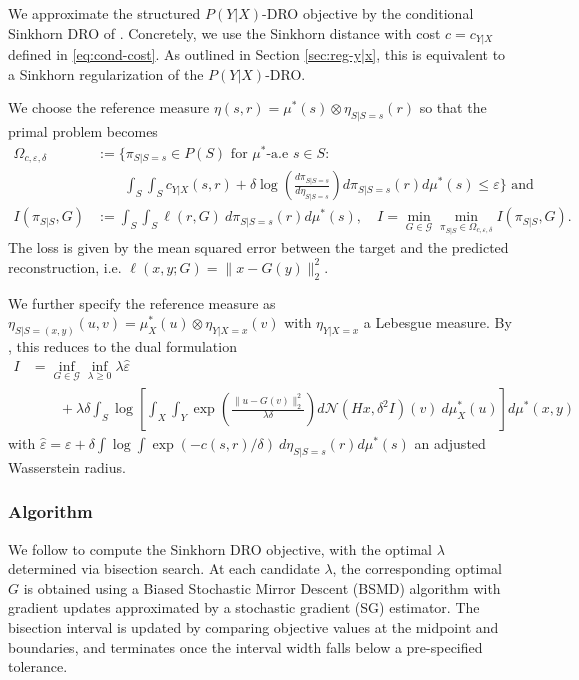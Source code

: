 \documentclass{article}
\newcommand{\Ocd}{\Omega_{c, \varepsilon, \delta}}
\theoremstyle{definition}
\theoremstyle{remarksty}
\begin{document}
We approximate the structured $P(Y|X)$-DRO objective by the conditional Sinkhorn DRO of \cite{wang_sinkhorn_2026}. Concretely, we use the Sinkhorn distance with cost $c=c_{Y|X}$ defined in \eqref{eq:cond-cost}. As outlined in Section \ref{sec:reg-y|x}, this is equivalent to a Sinkhorn regularization of the $P(Y|X)$-DRO.

We choose the reference measure $\eta(s,r)=\mu^*(s)\otimes\eta_{S|S=s}(r)$ so that the primal problem becomes
\begin{align*}
    \Ocd &:= \Big\{\pi_{S|S=s} \in P(S) \text{ for } \mu^*\text{-a.e } s\in S:\\
    &\qquad\int_S \int_S c_{Y|X}(s,r) + \delta \log\left(\frac{d\pi_{S|S=s}}{d\eta_{S|S=s}}\right) d\pi_{S|S=s}(r) d\mu^*(s) \leq \varepsilon\Big\}\text{ and }  \\
    I(\pi_{S|S}, G)&:=\int_S\int_S\ell(r,G)\ d\pi_{S|S=s}(r)d\mu^*(s), \quad I= \min_{G \in \mathcal{G}} \min_{\pi_{S|S} \in \Ocd} I(\pi_{S|S},G).
\end{align*}
The loss is given by the mean squared error between the target and the predicted reconstruction, i.e. $\ell(x,y;G)=\|x-G(y)\|^2_2$.  

We further specify the reference measure as $\eta_{S|S=(x,y)}(u,v)=\mu_X^*(u)\otimes\eta_{Y|X=x}(v)$ with $\eta_{Y|X=x}$ a Lebesgue measure. By \cite{wang_sinkhorn_2026}, this reduces to the dual formulation 
\begin{align}\label{eq:sinkhorn-dual}
    I & = \inf_{G\in \mathcal{G}} \inf_{\lambda \geq 0} \lambda \hat \varepsilon \nonumber \\
    & \qquad +  \lambda\delta\int_{S} \log \left[ \int_X\int_Y \exp\left(\frac{\|u-G(v)\|^2_2}{\lambda \delta}\right) d\mathcal{N}(Hx, \delta^2I)(v)\ d\mu_X^*(u)\right] d\mu^*(x,y)
\end{align}
with $\hat \varepsilon = \varepsilon + \delta \int\log\int\exp(-c(s,r)/\delta)\ d\eta_{S|S=s} (r) d\mu^*(s)$ an adjusted Wasserstein radius.

\subsubsection{Algorithm}
We follow \cite{wang_sinkhorn_2026} to compute the Sinkhorn DRO objective, with the optimal $\lambda$ determined via bisection search. At each candidate $\lambda$, the corresponding optimal $G$ is obtained using a Biased Stochastic Mirror Descent (BSMD) algorithm with gradient updates approximated by a stochastic gradient (SG) estimator. The bisection interval is updated by comparing objective values at the midpoint and boundaries, and terminates once the interval width falls below a pre-specified tolerance.
\end{document}
